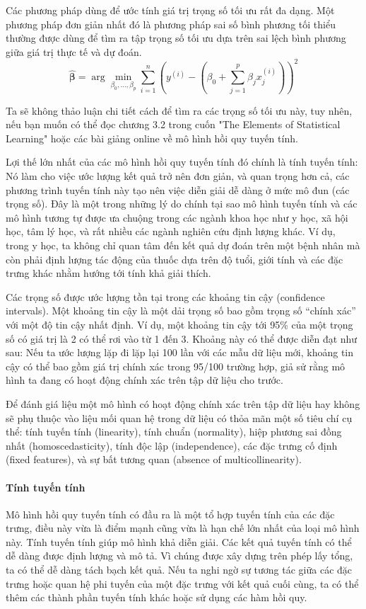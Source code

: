 Các phương pháp dùng để ước tính giá trị trọng số tối ưu rất đa dạng. Một phương pháp đơn giản nhất đó là phương pháp sai số bình phương tối thiểu thường được dùng để tìm ra tập trọng số tối ưu dựa trên sai lệch bình phương giữa giá trị thực tế và dự đoán.
$$\hat{\boldsymbol{\beta}}=\arg\!\min_{\beta_0,\ldots,\beta_p}\sum_{i=1}^n\left(y^{(i)}-\left(\beta_0+\sum_{j=1}^p\beta_jx^{(i)}_{j}\right)\right)^{2}$$

Ta sẽ không thảo luận chi tiết cách để tìm ra các trọng số tối ưu này, tuy nhên, nếu bạn muốn có thể đọc chương 3.2 trong cuốn "The Elements of Statistical Learning" hoặc các bài giảng online về mô hình hồi quy tuyến tính.

Lợi thế lớn nhất của các mô hình hồi quy tuyến tính đó chính là tính tuyến tính: Nó làm cho việc ước lượng kết quả trở nên đơn giản, và quan trọng hơn cả, các phương trình tuyến tính này tạo nên việc diễn giải dễ dàng ở mức mô đun (các trọng số). Đây là một trong những lý do chính tại sao mô hình tuyến tính và các mô hình tương tự được ưa chuộng trong các ngành khoa học như y học, xã hội học, tâm lý học, và rất nhiều các ngành nghiên cứu định lượng khác. Ví dụ, trong y học, ta không chỉ quan tâm đến kết quả dự đoán trên một bệnh nhân mà còn phải định lượng tác động của thuốc dựa trên độ tuổi, giới tính và các đặc trưng khác nhằm hướng tới tính khả giải thích.

Các trọng số được ước lượng tồn tại trong các khoảng tin cậy (confidence intervals). Một khoảng tin cậy là một dải trọng số bao gồm trọng số ``chính xác'' với một độ tin cậy nhất định. Ví dụ, một khoảng tin cậy tới 95\% của một trọng số có giá trị là 2 có thể rơi vào từ 1 đến 3. Khoảng này có thể được diễn đạt như sau: Nếu ta ước lượng lặp đi lặp lại 100 lần với các mẫu dữ liệu mới, khoảng tin cậy có thể bao gồm giá trị chính xác trong 95/100 trường hợp, giả sử rằng mô hình ta đang có hoạt động chính xác trên tập dữ liệu cho trước.

Để đánh giá liệu một mô hình có hoạt động chính xác trên tập dữ liệu hay không sẽ phụ thuộc vào liệu mối quan hệ trong dữ liệu có thỏa mãn một số tiêu chí cụ thể: tính tuyến tính (linearity), tính chuẩn (normality),  hiệp phương sai đồng nhất (homoscedasticity), tính độc lập (independence), các đặc trưng cố định (fixed features), và sự bất tương quan (absence of multicollinearity).

\paragraph{Tính tuyến tính}
Mô hình hồi quy tuyến tính có đầu ra là một tổ hợp tuyến tính của các đặc trưng, điều này vừa là điểm mạnh cũng vừa là hạn chế lớn nhất của loại mô hình này. Tính tuyến tính giúp mô hình khả diễn giải. Các kết quả tuyến tính có thể dễ dàng được định lượng và mô tả. Vì chúng được xây dựng trên phép lấy tổng, ta có thể dễ dàng tách bạch kết quả. Nếu ta nghi ngờ sự tương tác giữa các đặc trưng hoặc quan hệ phi tuyến của một đặc trưng với kết quả cuối cùng, ta có thể thêm các thành phần tuyến tính khác hoặc sử dụng các hàm hồi quy.

